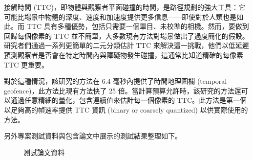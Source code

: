 \documentclass[10pt,UTF8]{ctexart}
\begin{document}
接觸時間 (TTC)，即物體與觀察者平面碰撞的時間，是路徑規劃的強大工具：它可能比場景中物體的深度、速度和加速度提供更多信息——即使對於人類也是如此。而 TTC 具有多種優勢，包括只需要一個單目、未校準的相機。然而，要做到回歸每個像素的 TTC 並不簡單，大多數現有方法對場景做出了過度簡化的假設。研究者們通過一系列更簡單的二元分類估計 TTC 來解決這一挑戰，他們以低延遲預測觀察者是否會在特定時間內與障礙物發生碰撞，這通常比知道精確的每像素 TTC 更重要。

對於這種情況，該研究的方法在 6.4 毫秒內提供了時間地理圍欄 (temporal geofence)，此方法比現有方法快了 25 倍。當計算預算允許時，該研究的方法還可以通過任意精細的量化，包含連續值來估計每一個像素的 TTC。此方法是第一個以足夠高的幀速率提供 TTC 資訊 (binary or coarsely quantized) 以供實際使用的方法。

另外專案測試資料與包含論文中展示的測試結果整理如下。

\begin{figure}[H]
\centering  %
\caption{測試論文資料}
\label{Fig.main}
\end{figure}
\end{document}
